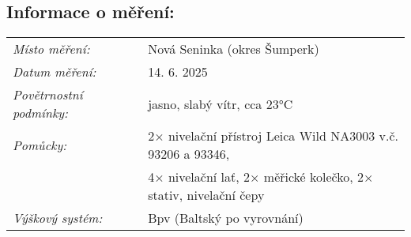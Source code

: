 \subsection*{Informace o měření:}
\begin{tabular}{lll} 
\textit{Místo měření:} & & Nová Seninka (okres Šumperk)\\ 
\textit{Datum měření:} & & 14. 6. 2025\\
\textit{Povětrnostní podmínky:} & & jasno, slabý vítr, cca 23°C\\ 
\textit{Pomůcky:} & & 2× nivelační přístroj Leica Wild NA3003 v.č. 93206 a 93346,\\ 
& & 4× nivelační lať, 2× měřické kolečko, 2× stativ, nivelační čepy\\
\textit{Výškový systém:} & & Bpv (Baltský po vyrovnání)\\ 
\end{tabular}
